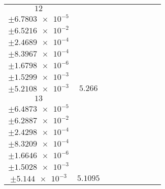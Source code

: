 \documentclass[8pt]{article}
\begin{document}
\begin{longtable}[l]{c c c c c c c c c}
$\num{12}$ & \begin{tabular}[c]{@{}c@{}}$\num{6.0296e-2}$ \\ $\pm\num{6.7803e-5}$\end{tabular} & \begin{tabular}[c]{@{}c@{}}$\num{-0.11125}$ \\ $\pm\num{6.5216e-2}$\end{tabular} & \begin{tabular}[c]{@{}c@{}}$\num{0.95528}$ \\ $\pm\num{2.4689e-4}$\end{tabular} & \begin{tabular}[c]{@{}c@{}}$\num{1.9819e+3}$ \\ $\pm\num{8.3967e-4}$\end{tabular} & \begin{tabular}[c]{@{}c@{}}$\num{3.9649}$ \\ $\pm\num{1.6798e-6}$\end{tabular} & \begin{tabular}[c]{@{}c@{}}$\num{1.1619}$ \\ $\pm\num{1.5299e-3}$\end{tabular} & \begin{tabular}[c]{@{}c@{}}$\num{4.2024}$ \\ $\pm\num{5.2108e-3}$\end{tabular} & $\num{5.266}$\\
$\num{13}$ & \begin{tabular}[c]{@{}c@{}}$\num{5.9973e-2}$ \\ $\pm\num{6.4873e-5}$\end{tabular} & \begin{tabular}[c]{@{}c@{}}$\num{-0.1301}$ \\ $\pm\num{6.2887e-2}$\end{tabular} & \begin{tabular}[c]{@{}c@{}}$\num{3.3757}$ \\ $\pm\num{2.4298e-4}$\end{tabular} & \begin{tabular}[c]{@{}c@{}}$\num{1.9843e+3}$ \\ $\pm\num{8.3209e-4}$\end{tabular} & \begin{tabular}[c]{@{}c@{}}$\num{3.9698}$ \\ $\pm\num{1.6646e-6}$\end{tabular} & \begin{tabular}[c]{@{}c@{}}$\num{1.1597}$ \\ $\pm\num{1.5028e-3}$\end{tabular} & \begin{tabular}[c]{@{}c@{}}$\num{4.1845}$ \\ $\pm\num{5.144e-3}$\end{tabular} & $\num{5.1095}$\\
\bottomrule
\end{longtable}
\end{document}
